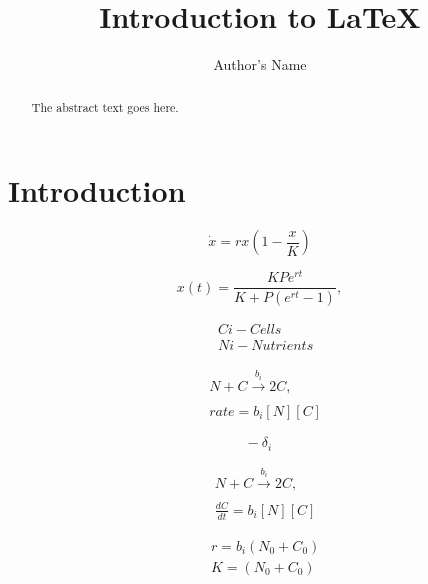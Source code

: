\documentclass{article}
\begin{document}
\title{Introduction to \LaTeX{}}
\author{Author's Name}

\maketitle

\begin{abstract}
The abstract text goes here.
\end{abstract}

\section{Introduction}


\begin{equation}
\label{eq:1}
\dot{x} = rx\left(1 - \frac{x}{K}\right)
\end{equation}

\begin{equation}
\label{eq:2}
x(t) = \frac{KPe^{rt}}{K + P(e^{rt}-1)},
\end{equation}

\begin{subequations}
	\begin{align}
	&C{i} - Cells\\
	&N{i} - Nutrients
	\end{align}
\end{subequations}

\begin{subequations}
	\label{eq:9}
	\begin{align}
		&N + C \xrightarrow[]{b_{i}} 2C,\\
		&rate = b_{i}[N][C]
	\end{align}
\end{subequations}

\begin{equation}
    -~\delta_{i}
\end{equation}

\begin{subequations}
	\label{eq:9}
	\begin{align}
	&N + C \xrightarrow[]{b_{i}} 2C,\\
	&\frac{dC}{dt} = b_{i}[N][C]
	\end{align}
\end{subequations}

\begin{subequations}
	\label{eq:9}
	\begin{align}
	&r = b_{i}(N_0 + C_0)\\
	&K = (N_0 + C_0)
	\end{align}
\end{subequations}
\end{document}
